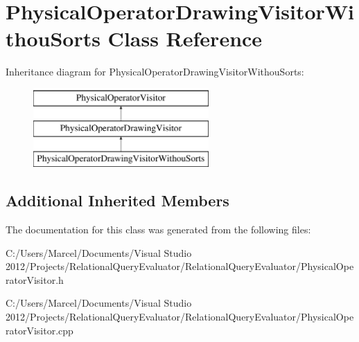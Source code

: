 \hypertarget{class_physical_operator_drawing_visitor_withou_sorts}{\section{Physical\+Operator\+Drawing\+Visitor\+Withou\+Sorts Class Reference}
\label{class_physical_operator_drawing_visitor_withou_sorts}
}
Inheritance diagram for Physical\+Operator\+Drawing\+Visitor\+Withou\+Sorts\+:\begin{figure}[H]
\begin{center}
\leavevmode
\includegraphics[height=3.000000cm]{class_physical_operator_drawing_visitor_withou_sorts}
\end{center}
\end{figure}
\subsection*{Additional Inherited Members}


The documentation for this class was generated from the following files\+:\begin{DoxyCompactItemize}
\item 
C\+:/\+Users/\+Marcel/\+Documents/\+Visual Studio 2012/\+Projects/\+Relational\+Query\+Evaluator/\+Relational\+Query\+Evaluator/Physical\+Operator\+Visitor.\+h\item 
C\+:/\+Users/\+Marcel/\+Documents/\+Visual Studio 2012/\+Projects/\+Relational\+Query\+Evaluator/\+Relational\+Query\+Evaluator/Physical\+Operator\+Visitor.\+cpp\end{DoxyCompactItemize}
